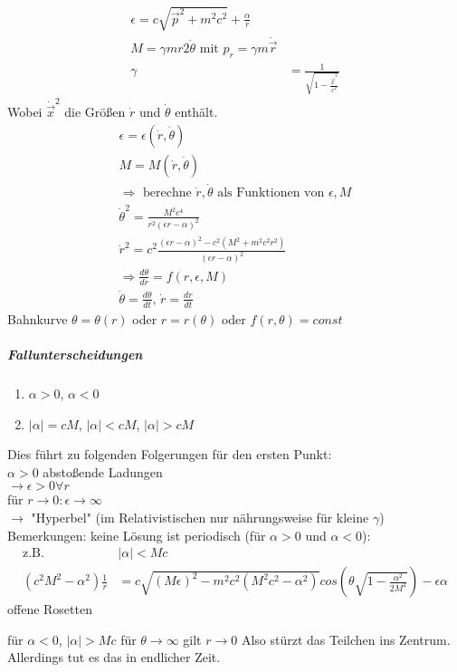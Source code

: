 \documentclass[a4paper]{article}
\begin{document}
\begin{align}
\epsilon=c\sqrt{\vec{p}^2+m^2c^2}+\frac{\alpha}{r}\\
M=\gamma mr2\dot{\theta} \text{ mit }p_r=\gamma m \dot{\vec{r}}\\
\gamma&=\frac{1}{\sqrt{1-\frac{\dot{\vec{x}}^2}{c^2}}}
\end{align}
Wobei $\dot{\vec{x}}^2$ die Größen $\dot{r}$ und $\dot{\theta}$ enthält.
\begin{align}
\epsilon=\epsilon(\dot{r},\dot{\theta})\\
M=M(\dot{r},\dot{\theta})\\
\Rightarrow \text{ berechne }\dot{r},\dot{\theta} \text{ als Funktionen von }
\epsilon,M\\
\dot{\theta}^2=\frac{M^2c^4}{r^2(\epsilon r -\alpha)^2}\\
\dot{r}^2=c^2\frac{(\epsilon r -\alpha)^2-c^2(M^2+m^2c^2r^2)}{(\epsilon r
-\alpha)^2}\\
\Rightarrow \frac{d\theta}{dr}=f(r,\epsilon,M)\\
\dot{\theta}=\frac{d\theta}{dt}\text{,  }\dot{r}=\frac{dr}{dt}
\end{align}
Bahnkurve $\theta=\theta(r)$ oder $r=r(\theta)$ oder
$f(r,\theta)=const$\\
\subparagraph{Fallunterscheidungen}
\begin{enumerate}
  \item $\alpha>0$, $\alpha<0$
  \item $|\alpha|=cM$, $|\alpha|<cM$, $|\alpha|>cM$
\end{enumerate}
Dies führt zu folgenden Folgerungen für den ersten Punkt:\\
$\alpha>0$ abstoßende Ladungen\\
$\rightarrow \epsilon>0 \forall r$\\
für $r\rightarrow 0: \epsilon\rightarrow\infty$\\
$\rightarrow$ "Hyperbel" (im Relativistischen nur nährungsweise für kleine
$\gamma$)
Bemerkungen:
keine Lösung ist periodisch (für $\alpha>0$ und $\alpha<0$):
\begin{align}
\text{z.B. } &|\alpha|<Mc\\
(c^2M^2-\alpha^2)\frac{1}{r}&=c\sqrt{(M\epsilon)^2-m^2c^2(M^2c^2-\alpha^2)}
cos\left(\theta\sqrt{1-\frac{\alpha^2}{2M^2}}\right)-\epsilon\alpha
\end{align}
offene Rosetten

für $\alpha<0$, $|\alpha|>Mc$
für $\theta\rightarrow\infty$ gilt $r\rightarrow0$
Also stürzt das Teilchen ins Zentrum. Allerdings tut es das in endlicher Zeit.
\end{document}
